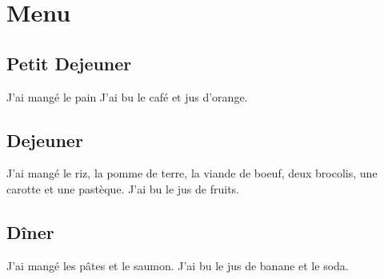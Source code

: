 \section{Menu}


\subsection*{Petit Dejeuner}
J'ai mangé le pain
J'ai bu le café et jus d'orange.

\subsection*{Dejeuner}
J'ai mangé le riz, la pomme de terre, la viande de boeuf, deux brocolis, une carotte et une pastèque.
J'ai bu le jus de fruits.

\subsection*{Dîner}
J'ai mangé les pâtes et le saumon.
J'ai bu le jus de banane et le soda.
